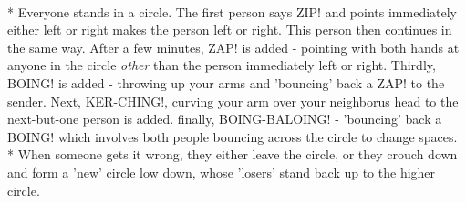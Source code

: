 \begin{minipage}{\textwidth}
\\*
Everyone stands in a circle. The first person says ZIP! and points immediately either left or right makes the person left or right.  This person then continues in the same way.  After a few minutes, ZAP! is added - pointing with both hands at anyone in the circle \textit{other} than the person immediately left or right.  Thirdly, BOING! is added - throwing up your arms and 'bouncing' back a ZAP! to the sender.  Next, KER-CHING!, curving your arm over your neighborus head to the next-but-one person is added.  finally, BOING-BALOING! - 'bouncing' back a BOING! which involves both people bouncing across the circle to change spaces.\\*
When someone gets it wrong, they either leave the circle, or they crouch down and form a 'new' circle low down, whose 'losers' stand back up to the higher circle.
\end{minipage}    \vfill
